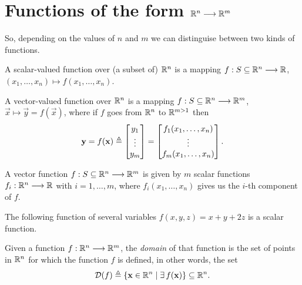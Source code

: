 \section{Functions of the form $\Rtn\longrightarrow\R^m$}
So, depending on the values of $n$ and $m$ we can distinguise between two kinds of functions.

\begin{defn}\label{def:scalar-function}
	A scalar-valued function over (a subset of) $\Rtn$ is a mapping $\appl{f}{S\subseteq\Rtn}{\R}$, $\left(x_1, \ldots, x_n\right)
	\longmapsto f\left(x_1, \ldots, x_n\right)$.
\end{defn}

\begin{defn}
	A vector-valued function over $\Rtn$ is a mapping $\appl{f}{S\subseteq\Rtn}{\R^m}$, $\vec{x}\longmapsto\vec{y} = f(\vec{x})$, where
	if $f$ goes from $\Rtn$ to $\R^{m>1}$ then
	\begin{equation}
		\mathbf{y} = f(\mathbf{x})\triangleq\begin{bmatrix}y_1 \\ \vdots \\ y_m \end{bmatrix} = \begin{bmatrix}f_1(x_1, \ldots, x_n) \\
		\vdots \\ f_m(x_1, \ldots, x_n)\end{bmatrix}.
	\end{equation}
\end{defn}

\begin{remark}
	A vector function $\appl{f}{S\subseteq\Rtn}{\R^m}$ is given by $m$ scalar functions $\appl{f_i}{\Rtn}{\R}$ with $i = 1, \ldots,
	m$, where $f_i(x_1, \ldots, x_n)$ gives us the $i$-th component of $f$.
\end{remark}

\begin{example}
    The following function of several variables $f(x, y, z) = x + y + 2z$ is a scalar function.
\end{example}


\begin{defn}[Domain]
Given a function $\stdvf$, the \textit{domain} of that function is the set of points in $\Rtn$ for which the function $f$ is 
defined, in other words, the set
\begin{equation}
\dom{f} \bydef \{\vec{x}\in\Rtn\st\exists f(\vec{x})\}\subseteq\Rtn.
\end{equation}
\end{defn}

